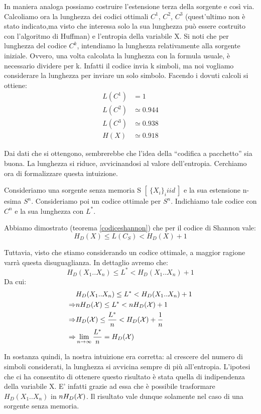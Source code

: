 In maniera analoga possiamo costruire l'estensione terza della sorgente e così via.
Calcoliamo ora la lunghezza dei codici ottimali $C^1$, $C^2$, $C^3$ (quest'ultimo non è stato indicato,ma visto che interessa solo la sua lunghezza può essere costruito con l'algoritmo di Huffman) e l'entropia della variabile X.
Si noti che per lunghezza del codice $C^k$, intendiamo la lunghezza relativamente alla sorgente iniziale. Ovvero, una volta 
calcolata la lunghezza con la formula usuale, è necessario dividere per k. Infatti il codice invia k simboli, ma noi vogliamo considerare la lunghezza per inviare un solo simbolo.
Facendo i dovuti calcoli si ottiene:
\[\begin{split}
 L(C^1)&=1 \\
 L(C^2)& \simeq 0.944 \\
 L(C^3)& \simeq 0.938 \\
 H(X)& \simeq 0.918
 \end{split}
\]

Dai dati che si ottengono, sembrerebbe che l'idea della ``codifica a pacchetto'' sia buona. La lunghezza si riduce, avvicinandosi 
al valore dell'entropia. Cerchiamo ora di formalizzare questa intuizione.

Consideriamo una sorgente senza memoria S $[ \ \{X_i\}_i iid \ ]$ e la sua estensione n-esima $S^n$. Consideriamo poi un codice ottimale per $S^n$. Indichiamo tale codice con $C^n$ e la sua lunghezza con $L^*$.

\noindent
Abbiamo dimostrato (teorema \ref{codiceshannon}) che per il codice di Shannon vale:
\[
 H_D(X) \le L(C_S) < H_D(X)+1
\]

\noindent
Tuttavia, visto che stiamo considerando un codice ottimale, a maggior ragione varrà questa disuguaglianza.
In dettaglio avremo che:
\[
 H_D(X_1..X_n) \le L^* < H_D(X_1..X_n)+1
\]
Da cui:
\[\begin{split} 
 & H_D(X_1..X_n) \le L^* < H_D(X_1..X_n)+1 \\
 \Rightarrow & n H_D(\mathcal{X}) \le L^* < nH_D(\mathcal{X}) + 1 \\
 \Rightarrow & H_D(\mathcal{X}) \le \frac{L^*}{n} < H_D(\mathcal{X}) + \frac{1}{n} \\
 \Rightarrow & \lim_{n \to \infty} \frac{L^*}{n}=H_D(\mathcal{X})  
  \end{split}
\]

In sostanza quindi, la nostra intuizione era corretta: al crescere del numero di simboli considerati, la lunghezza si avvicina sempre di 
più all'entropia. L'ipotesi che ci ha consentito di ottenere questo risultato è stata quella di indipendenza della variabile X.
E' infatti grazie ad essa che è possibile trasformare $H_D(X_1..X_n)$ in $n H_D(\mathcal{X})$. Il risultato vale dunque solamente nel caso 
di una sorgente senza memoria.

